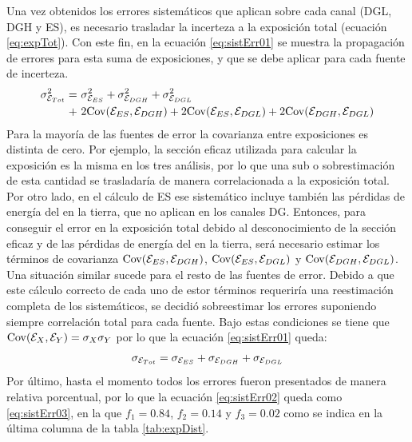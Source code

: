 	Una vez obtenidos los errores sistemáticos que aplican sobre cada canal (DGL, DGH y ES), es necesario trasladar la incerteza a la exposición total (ecuación \ref{eq:expTot}).
	Con este fin, en la ecuación \ref{eq:sistErr01} se muestra la propagación de errores para esta suma de exposiciones, y que se debe aplicar para cada fuente de incerteza.
	\begin{equation}
	\begin{aligned}
	\sigma_{{\cal E}_{Tot}}^2 = & 
	\ \sigma_{{\cal E}_{ES}}^2 + \sigma_{{\cal E}_{DGH}}^2 + \sigma_{{\cal E}_{DGL}}^2 \\
	+ &\  2 {\rm Cov}({\cal E}_{ES},{\cal E}_{DGH})
	+ 2 {\rm Cov}({\cal E}_{ES},{\cal E}_{DGL})
	+ 2 {\rm Cov}({\cal E}_{DGH},{\cal E}_{DGL})
	\end{aligned}
	\label{eq:sistErr01}
	\end{equation}
	Para la mayoría de las fuentes de error la covarianza entre exposiciones es distinta de cero.
	Por ejemplo, la sección eficaz utilizada para calcular la exposición es la misma en los tres análisis, por lo que una sub o sobrestimación de esta cantidad se trasladar\'ia de manera correlacionada a la exposición total.
	Por otro lado, en el cálculo de ES ese sistemático incluye tambi\'en las pérdidas de energía del \tauon{} en la tierra, que no aplican en los canales DG.
	Entonces, para conseguir el error en la exposición total debido al desconocimiento de la sección eficaz y de las pérdidas de energía del \tauon{} en la tierra, ser\'a necesario estimar los términos de covarianza ${\rm Cov}({\cal E}_{ES},{\cal E}_{DGH})$, ${\rm Cov}({\cal E}_{ES},{\cal E}_{DGL})$ y ${\rm Cov}({\cal E}_{DGH},{\cal E}_{DGL})$.
	Una situación similar sucede para el resto de las fuentes de error.
	Debido a que este cálculo correcto de cada uno de estor t\'erminos requeriría una reestimación completa de los sistemáticos, se decidió sobreestimar los errores suponiendo siempre correlación total para cada fuente.
	Bajo estas condiciones se tiene que ${\rm Cov}({\cal E}_{X},{\cal E}_{Y})=\sigma_{X}\sigma_{Y}$ por lo que la ecuación \ref{eq:sistErr01} queda:
	\begin{equation}
	\begin{aligned}
	\sigma_{{\cal E}_{Tot}} = \sigma_{{\cal E}_{ES}} + \sigma_{{\cal E}_{DGH}} + \sigma_{{\cal E}_{DGL}}
	\end{aligned}
	\label{eq:sistErr02}
	\end{equation}
	Por último, hasta el momento todos los errores fueron presentados de manera relativa porcentual, por lo que la ecuación \ref{eq:sistErr02} queda como \ref{eq:sistErr03}, en la que $f_1=0.84$, $f_2=0.14$ y $f_3=0.02$ como se indica en la última columna de la tabla \ref{tab:expDist}.
